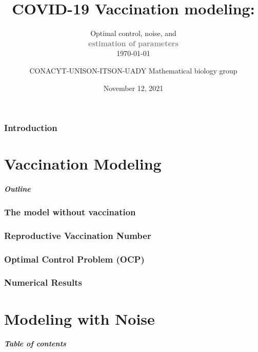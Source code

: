 \documentclass[9pt]{beamer}
\title{\Huge{COVID-19 Vaccination modeling:}}
\subtitle{%
    \huge{Optimal control, noise, and }
    \\
    \huge{
        \textbf{
            \textcolor{gray}{
                 estimation of parameters%
            }
        }
    }
    \\
    \normalsize{\today}
}
\author{
    \normalsize{%
        CONACYT-UNISON-ITSON-UADY Mathematical biology group
    }
}
\date{November 12, 2021}
\begin{document}
    \titlepage
         \section*{Introduction}
             
      \part{Vaccination Modeling}
          \begin{frame}
              \frametitle{Outline}
              \tableofcontents
          \end{frame}
         \section{The model without vaccination}
              
         \section{Reproductive Vaccination Number}
              
         \section{Optimal Control Problem (OCP)}
              
         \section{Numerical Results}
              
              
              
              
         \begin{frame}{}
        \end{frame}

    \part{Modeling with Noise}
        \begin{frame}
            \frametitle{Table of contents}
            \tableofcontents
        \end{frame}
\end{document}
